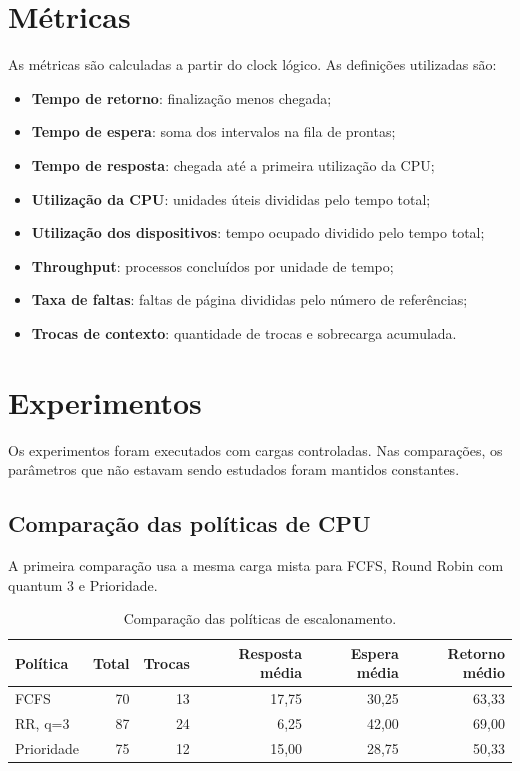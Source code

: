 \documentclass[11pt,a4paper]{article}
\begin{document}
\section{Métricas}

As métricas são calculadas a partir do clock lógico. As definições utilizadas são:

\begin{itemize}
\item \textbf{Tempo de retorno}: finalização menos chegada;
\item \textbf{Tempo de espera}: soma dos intervalos na fila de prontas;
\item \textbf{Tempo de resposta}: chegada até a primeira utilização da CPU;
\item \textbf{Utilização da CPU}: unidades úteis divididas pelo tempo total;
\item \textbf{Utilização dos dispositivos}: tempo ocupado dividido pelo tempo total;
\item \textbf{Throughput}: processos concluídos por unidade de tempo;
\item \textbf{Taxa de faltas}: faltas de página divididas pelo número de referências;
\item \textbf{Trocas de contexto}: quantidade de trocas e sobrecarga acumulada.
\end{itemize}

\section{Experimentos}

Os experimentos foram executados com cargas controladas. Nas comparações, os parâmetros que não estavam sendo estudados foram mantidos constantes.

\subsection{Comparação das políticas de CPU}

A primeira comparação usa a mesma carga mista para FCFS, Round Robin com quantum 3 e Prioridade.

\begin{table}[H]
\centering
\small
\begin{tabular}{lrrrrr}
\toprule
Política & Total & Trocas & Resposta média & Espera média & Retorno médio\\
\midrule
FCFS & 70 & 13 & 17,75 & 30,25 & 63,33\\
RR, q=3 & 87 & 24 & 6,25 & 42,00 & 69,00\\
Prioridade & 75 & 12 & 15,00 & 28,75 & 50,33\\
\bottomrule
\end{tabular}
\caption{Comparação das políticas de escalonamento.}
\end{table}
\end{document}
